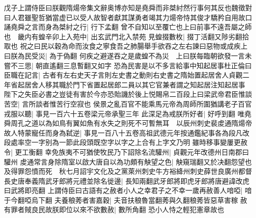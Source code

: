 戊子上謂侍臣曰朕觀隋煬帝集文辭奥博亦知是堯舜而非桀紂然行事何其反也魏徵對曰人君雖聖哲猶當虚已以受人故智者獻其謀勇者竭其力煬帝恃其俊才驕矜自用故口誦堯舜之言而身為桀紂之行|{
	行下孟翻}
曾不自知以至覆亡也上曰前事不遠吾屬之師也　畿内有蝗辛卯上入苑中|{
	出玄武門北入禁苑}
見蝗掇數枚|{
	掇丁活翻又陟劣翻拾取也}
祝之曰民以穀為命而汝食之寧食吾之肺腸舉手欲吞之左右諫曰惡物或成疾上曰朕為民受災|{
	為于偽翻}
何疾之避遂吞之是歲蝗不為災　上曰朕每臨朝欲發一言未嘗不三思|{
	朝直遙翻三息暫翻又如字}
恐為民害是以不多言給事中知起居事杜正倫曰臣職在記言|{
	古者有左右史天子言則左史書之動則右史書之隋始置起居舍人貞觀二年省起居舍人移其職於門下省置起居郎二員以其它官兼者謂之知起居注知起居事}
陛下之失臣必書之豈徒有害於今亦恐貽譏於後上悦賜帛二百段上曰梁武帝君臣惟談苦空|{
	言所談者惟苦行空寂也}
侯景之亂百官不能乘馬元帝為周師所圍猶講老子百官戎服以聽|{
	事見一百六十五卷梁元帝承聖三年}
此深足為戒朕所好者|{
	好呼到翻}
唯堯舜周孔之道以為如鳥有翼如魚有水失之則死不可暫無耳　以辰州刺史裴䖍通隋煬帝故人特蒙寵任而身為弑逆|{
	事見一百八十五卷高祖武德元年按通鑑紀事各為段凡改段處率空一字别為一節此段頭既空字以字之上合有上字文乃明}
雖時移事變屢更赦令|{
	更工衡翻}
幸免族夷不可猶使牧民乃下詔除名流驩州|{
	貞觀元年改德州日南郡曰驩州}
䖍通常言身除隋室以啟大唐自以為功頗有觖望之色|{
	觖窺瑞翻又於决翻怨望也}
及得罪怨憤而死　秋七月詔宇文化及之黨萊州刺史牛方裕絳州刺史薛世良廣州都督長史唐奉義隋武牙郎將元禮並除名徙邊|{
	長知兩翻武牙郎將即虎牙郎將唐避諱改虎曰武將即亮翻}
上謂侍臣曰古語有之赦者小人之幸君子之不幸一歲再赦善人喑啞|{
	喑于今翻啞烏下翻}
夫養稂莠者害嘉穀|{
	夫音扶稂魯當翻莠與久翻稂莠皆惡草害稼}
赦有罪者賊良民故朕即位以來不欲數赦|{
	數所角翻}
恐小人恃之輕犯憲章故也

